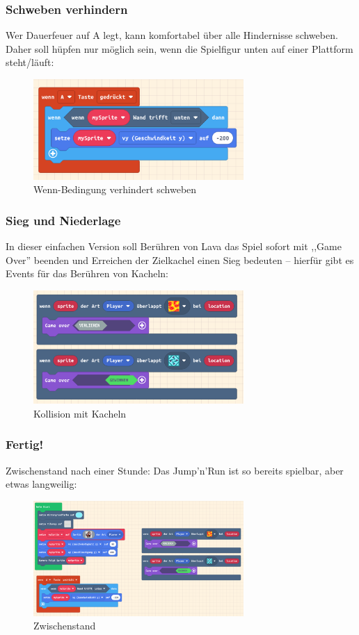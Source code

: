 \documentclass{beamer}
\begin{document}
\begin{frame}
 \frametitle{Schweben verhindern}
 
Wer Dauerfeuer auf A legt, kann komfortabel über alle Hindernisse schweben. Daher soll hüpfen nur möglich sein, wenn die Spielfigur unten auf einer Plattform steht/läuft:
 
\begin{figure}
  \includegraphics[width=8cm]{game30.png}
  \caption{Wenn-Bedingung verhindert schweben}
  \label{fig:game30}
\end{figure}
\end{frame}

\begin{frame}
 \frametitle{Sieg und Niederlage}
 
 In dieser einfachen Version soll Berühren von Lava das Spiel sofort mit ,,Game Over'' beenden und Erreichen der Zielkachel einen Sieg bedeuten – hierfür gibt es Events für das Berühren von Kacheln:
 
\begin{figure}
  \includegraphics[width=8cm]{game31.png}
  \caption{Kollision mit Kacheln}
  \label{fig:game31}
\end{figure}
\end{frame}

\begin{frame}
 \frametitle{Fertig!}
 
 Zwischenstand nach einer Stunde: Das Jump'n'Run ist so bereits spielbar, aber etwas langweilig:
 
\begin{figure}
  \includegraphics[width=8cm]{game32.png}
  \caption{Zwischenstand}
  \label{fig:game32}
\end{figure}
\end{frame}
\end{document}
